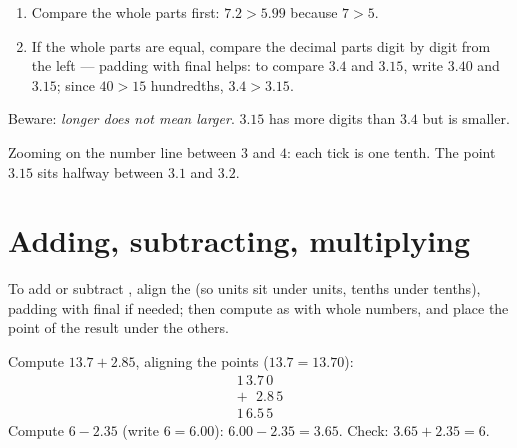 \begin{method}\label{met:g6:decimals:compare}
\begin{enumerate}
  \item Compare the whole parts first: $7.2 > 5.99$ because $7 > 5$.
  \item If the whole parts are equal, compare the decimal parts digit by
        digit from the left --- padding with final  helps:
        to compare $3.4$ and $3.15$, write $3.40$ and $3.15$;
        since $40 > 15$ hundredths, $3.4 > 3.15$.
\end{enumerate}
Beware: \emph{longer does not mean larger}. $3.15$ has more digits than
$3.4$ but is smaller.
\end{method}

\begin{omfigure}

{\small Zooming on the number line between $3$ and $4$: each tick is one
tenth. The point $3.15$ sits halfway between $3.1$ and $3.2$.}
\end{omfigure}

\section{Adding, subtracting, multiplying}

\begin{method}\label{met:g6:decimals:columns}
To add or subtract , align the \emph{}
(so units sit under units, tenths under tenths), padding with final
 if needed; then compute as with whole numbers, and place the point
of the result under the others.
\end{method}

\begin{example}\label{ex:g6:decimals:addsub}
Compute $13.7 + 2.85$, aligning the points ($13.7 = 13.70$):
\[
\begin{array}{r}
1\,3.7\,0 \\
+\ \ \,2.8\,5 \\
\hline
1\,6.5\,5
\end{array}
\]
Compute $6 - 2.35$ (write $6 = 6.00$):
$6.00 - 2.35 = 3.65$. Check: $3.65 + 2.35 = 6$.
\end{example}

